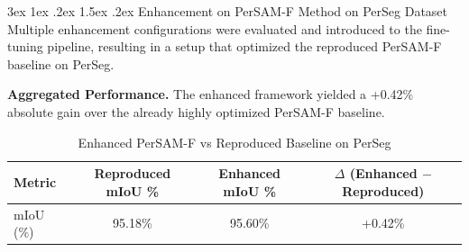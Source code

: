 \documentclass[journal,12pt,onecolumn,draftclsnofoot]{IEEEtran}
\makeatletter
\renewcommand{\subsection}{\@startsection{subsection}{2}{\z@}%
    {3ex \@plus 1ex \@minus .2ex}%
    {1.5ex \@plus.2ex}%
    {\normalfont\large\bfseries}}
\makeatother
\begin{document}
\begin{table}[htbp]
\centering
\caption{Enhancements Activated in the PerSeg PerSAM Experiment}
\label{tab:enh_persam_active}
\renewcommand{\arraystretch}{1.4}
\end{table}

\subsection{Enhancement on PerSAM-F Method on PerSeg Dataset}
Multiple enhancement configurations were evaluated and introduced to the fine-tuning pipeline, resulting in a setup that optimized the reproduced PerSAM-F baseline on PerSeg. 

\textbf{Aggregated Performance.} The enhanced framework yielded a +0.42\% absolute gain over the already highly optimized PerSAM-F baseline.

\begin{table}[htbp]
\centering
\caption{Enhanced PerSAM-F vs Reproduced Baseline on PerSeg}
\label{tab:enhanced_persamf_agg}
\begin{tabular}{l c c c}
\toprule
\textbf{Metric} & \textbf{Reproduced mIoU \%} & \textbf{Enhanced mIoU \%} & \textbf{$\Delta$ (Enhanced $-$ Reproduced)} \\
\midrule
mIoU (\%) & 95.18\% & 95.60\% & +0.42\% \\
\bottomrule
\end{tabular}
\end{table}
\end{document}
